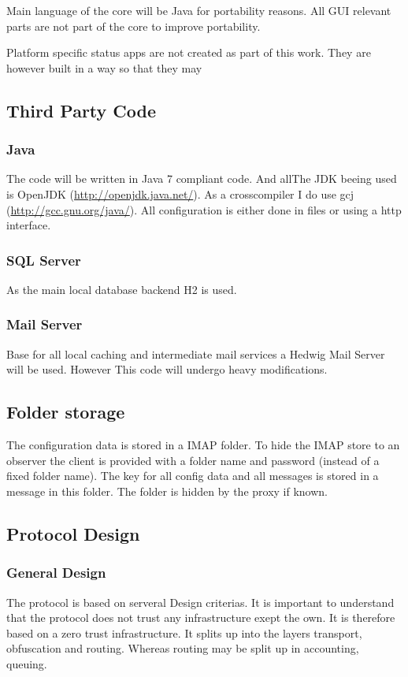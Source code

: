 Main language of the core will be Java for portability reasons. All GUI relevant parts are not part of the core to improve portability.\par

Platform specific status apps are not created as part of this work. They are however built in a way so that they may

\subsection{Third Party Code}
\subsubsection{Java}
The code will be written in Java 7 compliant code. And allThe JDK beeing used is OpenJDK (\url{http://openjdk.java.net/}). As a crosscompiler I do use gcj (\url{http://gcc.gnu.org/java/}). All configuration is either done in files or using a http interface.

\subsubsection{SQL Server}
As the main local database backend H2 is used. 

\subsubsection{Mail Server}
Base for all local caching and intermediate mail services a Hedwig Mail Server will be used. However This code will undergo heavy modifications.

\subsection{Folder storage}
The configuration data is stored in a IMAP folder. To hide the IMAP store to an observer the client is provided with a folder name and password (instead of a fixed folder name). The key for all config data and all messages is stored in a message in this folder. The folder is hidden by the proxy if known.

\subsection{Protocol Design}
\subsubsection{General Design}
The protocol is based on serveral Design criterias. It is important to understand that the protocol does not trust any infrastructure exept the own. It is therefore based on a zero trust infrastructure. It splits up into the layers transport, obfuscation and routing. Whereas routing may be split up in accounting, queuing.

